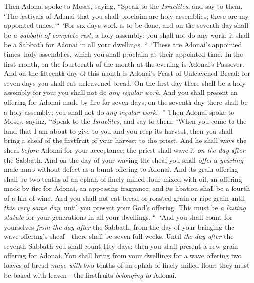 \begin{biblechapter} %
 Then Adonai spoke to Moses, saying,
\verse “Speak to the \textit{Israelites}, and say to them, ‘The festivals of Adonai that you shall proclaim are holy assemblies; these are my appointed times.
 “ ‘For six days work is to be done, and on the seventh day shall be \textit{a Sabbath of complete rest}, a holy assembly; you shall not do any work; it shall be a Sabbath for Adonai in all your dwellings.
 “ ‘These are Adonai’s appointed times, holy assemblies, which you shall proclaim at their appointed time.
\verse In the first month, on the fourteenth of the month at the evening is Adonai’s Passover.
\verse And on the fifteenth day of this month is Adonai’s Feast of Unleavened Bread; for seven days you shall eat unleavened bread.
\verse On the first day there shall be a holy assembly for you; you shall not do \textit{any regular work}.
\verse And you shall present an offering for Adonai made by fire for seven days; on the seventh day there shall be a holy assembly; you shall not do \textit{any regular work}.’ ”
 Then Adonai spoke to Moses, saying,
\verse “Speak to the \textit{Israelites}, and say to them, ‘When you come to the land that I am about to give to you and you reap its harvest, then you shall bring a sheaf of the firstfruit of your harvest to the priest.
\verse And he shall wave the sheaf \textit{before} Adonai for your acceptance; the priest shall wave it \textit{on the day after} the Sabbath.
\verse And on the day of your waving the sheaf you shall \textit{offer} a \textit{yearling} male lamb without defect as a burnt offering to Adonai.
\verse And its grain offering shall be two-tenths of an ephah of finely milled flour mixed with oil, an offering made by fire for Adonai, an appeasing fragrance; and its libation shall be a fourth of a hin of wine.
\verse And you shall not eat bread or roasted grain or ripe grain until \textit{this very same day}, until you present your God’s offering. This must be \textit{a lasting statute} for your generations in all your dwellings.
 “ ‘And you shall count for yourselves \textit{from the day after} the Sabbath, from the day of your bringing the wave offering’s sheaf—there shall be seven full weeks.
\verse Until \textit{the day after} the seventh Sabbath you shall count fifty days; then you shall present a new grain offering for Adonai.
\verse You shall bring from your dwellings for a wave offering two loaves of bread \textit{made with} two-tenths of an ephah of finely milled flour; they must be baked with leaven—the firstfruits \textit{belonging to} Adonai.

\end{biblechapter}
